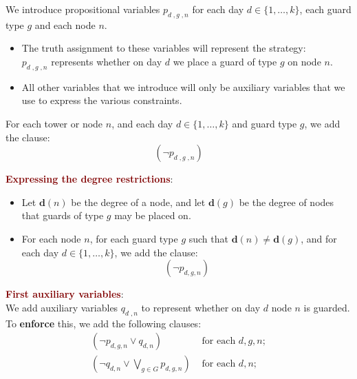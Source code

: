 \vspace{0.5cm}

We introduce propositional variables $p_{d\; ,g\; ,n}$ for each day $d \in \{1, \ldots, k\}$, each guard type $g$ and each node $n$.
\begin{itemize}
\setlength\itemsep{0em}
    \item The truth assignment to these variables will represent the strategy: \\
    \textcolor{NavyBlue}{$p_{d\; ,g\; ,n}$ represents whether on day $d$ we place a guard of type $g$ on node $n$.}
    \item All other variables that we introduce will only be auxiliary variables that we use to express the various constraints.
\end{itemize}

For each tower or node $n$, and each day $d \in \{1, \ldots, k\}$ and guard type $g$, we add the clause:
$$ (\neg p_{d\; ,g\; ,n}) $$

\vspace{1cm}

{\Large \textbf{\textcolor{Maroon}{Expressing the degree restrictions}}:} 
\begin{itemize}
    \item Let $\mathbf{d}(n)$ be the degree of a node, and let $\mathbf{d}(g)$ be the degree of nodes that guards of type $g$ may be placed on.
    \item For each node $n$, for each guard type $g$ such that $\boldsymbol{d}(n) \neq \boldsymbol{d}(g)$, and for each day $d \in\{1, \ldots, k\}$, we add the clause:
    $$
    \left(\neg p_{d, g, n}\right)
    $$ 
\end{itemize}

\vspace{1cm}

{\Large \textbf{\textcolor{Maroon}{First auxiliary variables}}:} \\
We add auxiliary variables $q_{d\;, n}$ to represent whether on day $d$ node $n$ is guarded. To \textbf{enforce} this, we add the following clauses:
\begin{align*}
    \left(\neg p_{d, g, n} \vee q_{d, n}\right) &\text{ for each } d, g, n ; \\
    (\neg q_{d, n} \vee \bigvee_{g \in G} p_{d, g, n}) &\text{ for each } d, n;
\end{align*}

\newpage

